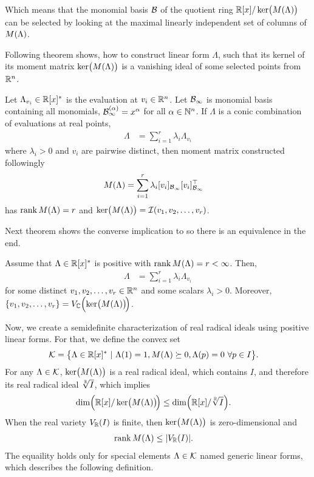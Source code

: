 Which means that the monomial basis $\mathcal{B}$ of the quotient ring $\mathbb{R}[x]/\operatorname{ker}\!\big(M(\Lambda)\big)$ can be selected by looking at the maximal linearly independent set of columns of $M(\Lambda)$.

Following theorem shows, how to construct linear form $\Lambda$, such that its kernel of its moment matrix $\operatorname{ker}\!\big(M(\Lambda)\big)$ is a vanishing ideal of some selected points from $\mathbb{R}^n$.

\begin{theorem}
  Let $\Lambda_{v_i}\in\mathbb{R}[x]^*$ is the evaluation at $v_i\in\mathbb{R}^n$.
  Let $\mathcal{B}_\infty$ is monomial basis containing all monomials, $\mathcal{B}_\infty^{(\alpha)} = x^\alpha$ for all $\alpha\in\mathbb{N}^n$.
  If $\Lambda$ is a conic combination of evaluations at real points,
  \begin{align}
    \Lambda &= \sum_{i=1}^r \lambda_i\Lambda_{v_i}
  \end{align}
  where $\lambda_i>0$ and $v_i$ are pairwise distinct, then moment matrix constructed followingly
  \begin{align}
    M(\Lambda) &=\sum_{i=1}^r \lambda_i[v_i]_{\mathcal{B}_\infty}[v_i]_{\mathcal{B}_\infty}^\top
  \end{align}
  has $\operatorname{rank}M(\Lambda) = r$ and $\operatorname{ker}\!\big(M(\Lambda)\big) = \mathcal{I}(v_1, v_2, \ldots, v_r)$.
\end{theorem}

Next theorem shows the converse implication to  so there is an equivalence in the end.

\begin{theorem}
  Assume that $\Lambda\in\mathbb{R}[x]^*$ is positive with $\operatorname{rank}M(\Lambda) = r < \infty$.
  Then,
  \begin{align}
    \Lambda &= \sum_{i=1}^r\lambda_i\Lambda_{v_i}
  \end{align}
  for some distinct $v_1, v_2, \ldots, v_r\in\mathbb{R}^n$ and some scalars $\lambda_i > 0$.
  Moreover, $\{v_1, v_2, \ldots, v_r\}=V_{\mathbb{C}}\Big(\!\operatorname{ker}\!\big(M(\Lambda)\big)\!\Big)$.
\end{theorem}

Now, we create a semidefinite characterization of real radical ideals using positive linear forms.
For that, we define the convex set
\begin{align}
  \K &= \big\{\Lambda\in\R[x]^*\ |\ \Lambda(1) = 1, \ML \succeq 0, \Lambda(p) = 0\ \forall p\in I\big\}.\labeleq{POP:sol:K}
\end{align}
For any $\Lambda\in\mathcal{K}$, $\operatorname{ker}\!\big(M(\Lambda)\big)$ is a real radical ideal, which contains $I$, and therefore its real radical ideal $\sqrt[\mathbb{R}]{I}$, which implies
\begin{align}
  \dim\!\Big(\mathbb{R}[x]/\operatorname{ker}\!\big(M(\Lambda)\big)\!\Big) &\leq \dim\!\Big(\mathbb{R}[x]/\sqrt[\mathbb{R}]{I}\Big).
\end{align}
When the real variety $V_{\mathbb{R}}(I)$ is finite, then $\operatorname{ker}\!\big(M(\Lambda)\big)$ is zero-dimensional and
\begin{align}
  \operatorname{rank}M(\Lambda) &\leq |V_{\mathbb{R}}(I)|.
\end{align}
The equaility holds only for special elements $\Lambda\in\mathcal{K}$ named generic linear forms, which describes the following definition.

